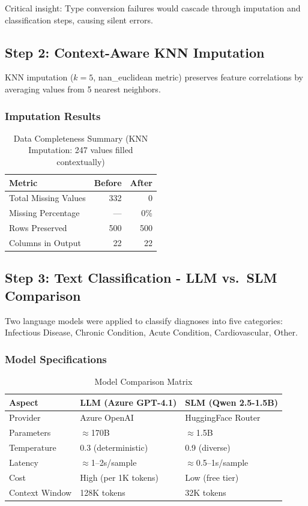 \documentclass[10pt,a4paper]{article}
\begin{document}
Critical insight: Type conversion failures would cascade through imputation and classification steps, causing silent errors.

\subsection{Step 2: Context-Aware KNN Imputation}

KNN imputation ($k=5$, nan\_euclidean metric) preserves feature correlations by averaging values from 5 nearest neighbors.

\subsubsection{Imputation Results}

\begin{table}[h]
\centering
\begin{tabular}{lrr}
\toprule
\textbf{Metric} & \textbf{Before} & \textbf{After} \\
\midrule
Total Missing Values & 332 & 0 \\
Missing Percentage & --- & 0\% \\
Rows Preserved & 500 & 500 \\
Columns in Output & 22 & 22 \\
\bottomrule
\end{tabular}
\caption{Data Completeness Summary (KNN Imputation: 247 values filled contextually)}
\end{table}

\subsection{Step 3: Text Classification - LLM vs.\ SLM Comparison}

Two language models were applied to classify diagnoses into five categories: Infectious Disease, Chronic Condition, Acute Condition, Cardiovascular, Other.

\subsubsection{Model Specifications}

\begin{table}[h]
\centering
\begin{tabular}{lll}
\toprule
\textbf{Aspect} & \textbf{LLM (Azure GPT-4.1)} & \textbf{SLM (Qwen 2.5-1.5B)} \\
\midrule
Provider & Azure OpenAI & HuggingFace Router \\
Parameters & $\approx$170B & $\approx$1.5B \\
Temperature & 0.3 (deterministic) & 0.9 (diverse) \\
Latency & $\approx$1--2s/sample & $\approx$0.5--1s/sample \\
Cost & High (per 1K tokens) & Low (free tier) \\
Context Window & 128K tokens & 32K tokens \\
\bottomrule
\end{tabular}
\caption{Model Comparison Matrix}
\end{table}
\end{document}

